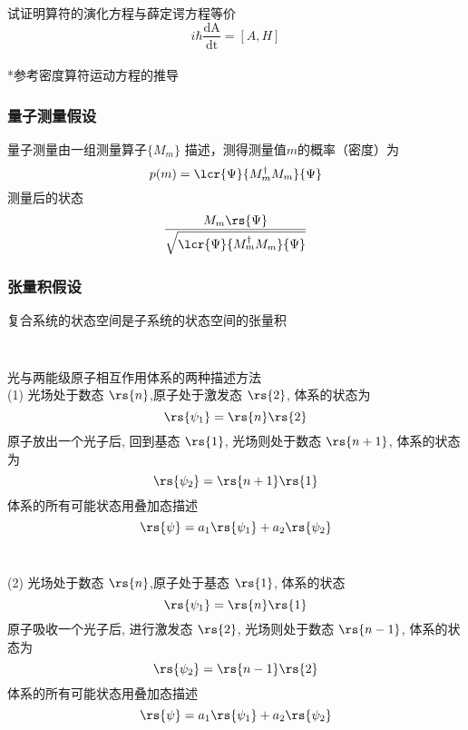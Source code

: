 \begin{frame}
 \frametitle{}
    试证明算符的演化方程与薛定谔方程等价 \\ \vspace*{2.3em}
    \[ i\hbar\frac{\mathrm{d A}}{\mathrm{d t}} =  [A, H ] \]
    ~\\ \vspace*{2.3em}
    *参考密度算符运动方程的推导
\end{frame}


\begin{frame}
    \frametitle{量子测量假设}
    \begin{tcolorbox4}[3. 量子测量假设]
    量子测量由一组测量算子$\{ M_m\}$ 描述，测得测量值$m$的概率（密度）为
    \[ p(m)=\lcr{\Psi}{M_m ^\dagger M_m}{\Psi} 
     \]
     测量后的状态 \[\frac{M_m\rs{\Psi}}{\sqrt{\lcr{\Psi}{M_m ^\dagger M_m}{\Psi}}}\]
    \end{tcolorbox4}
\end{frame}

\begin{frame}
    \frametitle{张量积假设}
    \begin{tcolorbox4}[4. 复合系统假设]
    复合系统的状态空间是子系统的状态空间的张量积
    \end{tcolorbox4}
\end{frame}

\begin{frame} 
    \frametitle{}
    ~ \\ 
    {\Bullet}光与两能级原子相互作用体系的两种描述方法 \\ \vspace*{0.6em}
    (1) 光场处于数态 $\rs{n}$,原子处于激发态 $\rs{2}$, 体系的状态为
    \[ \rs{\psi_1}  = \rs{n} \rs{2}\]
    原子放出一个光子后, 回到基态 $\rs{1}$, 光场则处于数态 $\rs{n+1}$, 体系的状态为 
    \[\rs{\psi_2} = \rs{n+1} \rs{1}\]
    体系的所有可能状态用叠加态描述 
    \[\rs{\psi} = a_1 \rs{\psi_1} + a_2\rs{\psi_2}\]
    \end{frame}
    
    \begin{frame} 
        \frametitle{}
        ~ \\ 
        (2) 光场处于数态 $\rs{n}$,原子处于基态 $\rs{1}$, 体系的状态
        \[ \rs{\psi_1}  = \rs{n} \rs{1}\]
        原子吸收一个光子后, 进行激发态 $\rs{2}$, 光场则处于数态 $\rs{n-1}$, 体系的状态为 
        \[\rs{\psi_2} = \rs{n-1} \rs{2}\]
        体系的所有可能状态用叠加态描述 
        \[\rs{\psi} = a_1 \rs{\psi_1} + a_2\rs{\psi_2}\]
    \end{frame}

